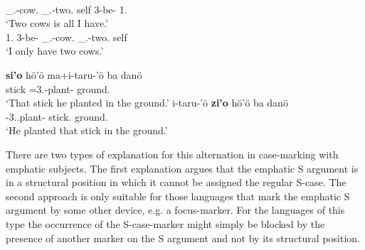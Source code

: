 \begin{exe}\ex\label{TurEmphExa}
\begin{xlist}
\ex\gll{}    \\
\Non{}\_\neu{}.\pl{}-cow.\acc{} \Non{}\_\neu{}.\pl{}-two.\acc{} self 3-be-\pl{} 1\sg{}.\acc{}\\
\glt `Two cows is all I have.'
\ex\gll{}    \\
1\sg{}.\acc{} 3-be-\pl{} \Non{}\_\neu{}.\pl{}-cow.\nom{} \Non\_\neu{}.\pl{}-two.\nom{} self\\
\glt `I only have two cows.'
\end{xlist} 
\end{exe}

\begin{exe}\ex\label{NiaEmphExa}
\begin{xlist}\ex\gll
\textbf{si'o} h\"o'\"o ma+i-taru-'\"o ba dan\"o\\
stick \dist{} \prf{}=3\sg{}.\rls{}-plant-\transitiv{} \loc{} ground.\mut{}\\
\glt `That stick he planted in the ground.'
\ex\gll 
i-taru-'\"o \textbf{zi'o} h\"o'\"o ba dan\"o\\
\prf{}-3\sg{}.\rls{}.plant-\transitiv{} stick.\mut{} \dist{} \loc{} ground.\mut{}\\
\glt `He planted that stick in the ground.'
\end{xlist}\end{exe}

There are two types of explanation for this alternation in case-marking with emphatic subjects. 
The first explanation argues that the emphatic S argument is in a structural position in which it cannot be assigned the regular S-case. 
The second approach is only suitable for those languages that mark the emphatic S argument by some other device, e.g. a focus-marker. 
For the languages of this type the occurrence of the S-case-marker might simply be blocked by the presence of another marker on the S argument and not by its structural position. 

